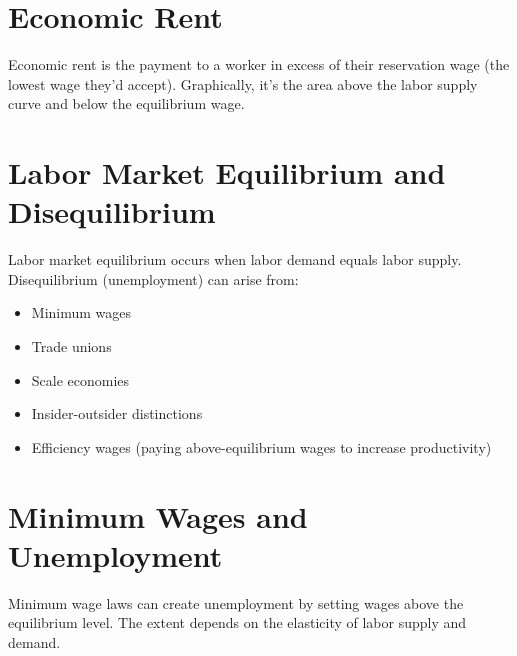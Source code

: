 \section*{Economic Rent}
Economic rent is the payment to a worker in excess of their reservation wage (the lowest wage they'd accept). Graphically, it's the area above the labor supply curve and below the equilibrium wage.

\section*{Labor Market Equilibrium and Disequilibrium}
Labor market equilibrium occurs when labor demand equals labor supply. Disequilibrium (unemployment) can arise from:
\begin{itemize}
    \item Minimum wages
    \item Trade unions
    \item Scale economies
    \item Insider-outsider distinctions
    \item Efficiency wages (paying above-equilibrium wages to increase productivity)
\end{itemize}

\section*{Minimum Wages and Unemployment}
Minimum wage laws can create unemployment by setting wages above the equilibrium level. The extent depends on the elasticity of labor supply and demand.
